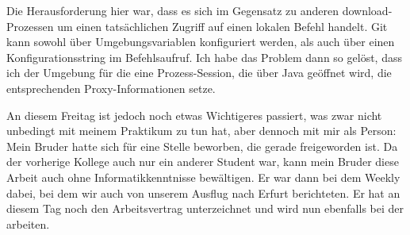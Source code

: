 Die Herausforderung hier war, dass es sich im Gegensatz zu anderen download-Prozessen um einen tatsächlichen Zugriff auf einen lokalen Befehl handelt.
Git kann sowohl über Umgebungsvariablen konfiguriert werden, als auch über einen Konfigurationsstring im Befehlsaufruf.
Ich habe das Problem dann so gelöst, dass ich der Umgebung für die eine Prozess-Session, die über Java geöffnet wird, die entsprechenden Proxy-Informationen setze.

An diesem Freitag ist jedoch noch etwas Wichtigeres passiert, was zwar nicht unbedingt mit meinem Praktikum zu tun hat, aber dennoch mit mir als Person:
Mein Bruder hatte sich für eine Stelle beworben, die gerade freigeworden ist.
Da der vorherige Kollege auch nur ein anderer Student war, kann mein Bruder diese Arbeit auch ohne Informatikkenntnisse bewältigen.
Er war dann bei dem Weekly dabei, bei dem wir auch von unserem Ausflug nach Erfurt berichteten.
Er hat an diesem Tag noch den Arbeitsvertrag unterzeichnet und wird nun ebenfalls bei der {\metaeffekt} arbeiten.
